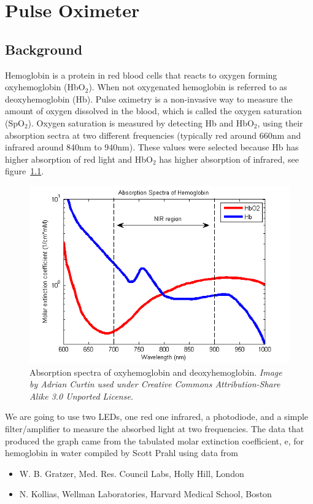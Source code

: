 \chapter{Pulse Oximeter}

\section{Background}
Hemoglobin is a protein in red blood cells that reacts to oxygen forming oxyhemoglobin (HbO$_2$).  When not oxygenated hemoglobin is referred to as deoxyhemoglobin (Hb).  Pulse oximetry is a non-invasive way to measure the amount of oxygen dissolved in the blood, which is called the oxygen saturation (SpO$_2$). Oxygen saturation is measured by detecting Hb and HbO$_2$, using their absorption sectra at two different frequencies (typically red around 660nm and infrared around 840nm to 940nm).  These values were selected because Hb has higher absorption of red light and HbO$_2$ has higher absorption of infrared, see figure~\ref{fig-spectrum}.

 \begin{figure}
 \caption{Absorption spectra of oxyhemoglobin and deoxyhemoglobin. \emph{Image by Adrian Curtin used under  Creative Commons Attribution-Share Alike 3.0 Unported License.}}
 \label{fig-spectrum}
 \includegraphics{../images/Oxy_and_Deoxy_Hemoglobin_Near-Infrared_absorption_spectra.png}
 \end{figure}

We are going to use two LEDs, one red one infrared, a photodiode, and a simple filter/amplifier to measure the absorbed light at two frequencies.  The data that produced the graph came from the tabulated molar extinction coefficient, e, for hemoglobin in water compiled by Scott Prahl using data from
\begin{itemize}
\item W. B. Gratzer, Med. Res. Council Labs, Holly Hill, London 
\item N. Kollias, Wellman Laboratories, Harvard Medical School, Boston
\end{itemize}


